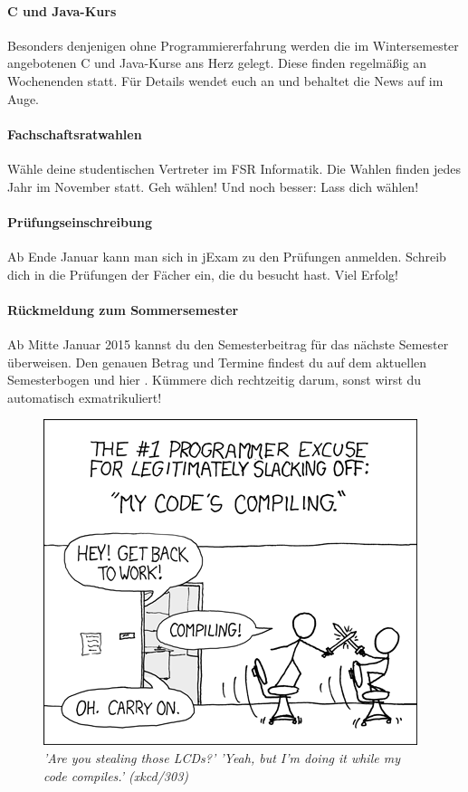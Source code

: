 \paragraph{C und Java-Kurs}
Besonders denjenigen ohne Programmiererfahrung werden die im Wintersemester angebotenen C und Java-Kurse ans Herz gelegt.
Diese finden regelmäßig an Wochenenden statt.
Für Details wendet euch an \link und behaltet die News auf \link im Auge.

\paragraph{Fachschaftsratwahlen}
Wähle deine studentischen Vertreter im FSR Informatik.
Die Wahlen finden jedes Jahr im November statt.
Geh wählen!
Und noch besser: Lass dich wählen!

\paragraph{Prüfungseinschreibung}
Ab Ende Januar kann man sich in jExam zu den Prüfungen anmelden.
Schreib dich in die Prüfungen der Fächer ein, die du besucht hast.
Viel Erfolg!

\paragraph{Rückmeldung zum Sommersemester}
Ab Mitte Januar 2015 kannst du den Semesterbeitrag für das nächste Semester überweisen.
Den genauen Betrag und Termine findest du auf dem aktuellen Semesterbogen und hier \link.
Kümmere dich rechtzeitig darum, sonst wirst du automatisch exmatrikuliert!

\begin{figure}[h!]
\centering \includegraphics[width=\linewidth]{img/xkcd/compiling.png}
\caption*{{\small \textit{'Are you stealing those LCDs?' 'Yeah, but I'm doing it while my code compiles.' (xkcd/303)}}}
\end{figure}
